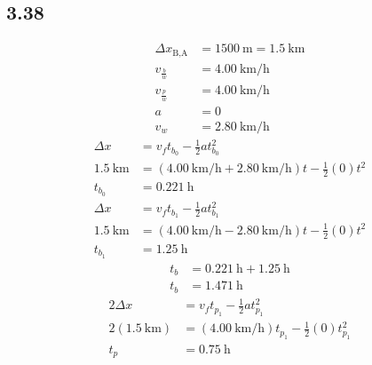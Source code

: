 \documentclass{article}
\begin{document}
\subsection{3.38}
\begin{align*}
	\Delta x_\text{B,A} & = \SI{1500}{\meter} = \SI{1.5}{\kilo \meter} \\
	v_\frac{b}{w} & = \SI{4.00}{\kilo \meter \per \hour} \\
	v_\frac{p}{w} & = \SI{4.00}{\kilo \meter \per \hour} \\
	a & = 0 \\
	v_w & = \SI{2.80}{\kilo \meter \per \hour}
\end{align*}
\begin{align*}
	\Delta x & = v_ft_{b_0} - \frac{1}{2}at_{b_0}^2 \\
	\SI{1.5}{\kilo \meter} & = (\SI{4.00}{\kilo \meter \per \hour} + \SI{2.80}{\kilo \meter \per \hour})t - \frac{1}{2}(0)t^2 \\
	t_{b_0} & = \SI{0.221}{\hour}
\end{align*}
\begin{align*}
	\Delta x & = v_ft_{b_1} - \frac{1}{2}at_{b_1}^2 \\
	\SI{1.5}{\kilo \meter} & = (\SI{4.00}{\kilo \meter \per \hour} - \SI{2.80}{\kilo \meter \per \hour})t - \frac{1}{2}(0)t^2 \\
	t_{b_1} & = \SI{1.25}{\hour}
\end{align*}
\begin{align*}
	t_b & = \SI{0.221}{\hour} + \SI{1.25}{\hour} \\
	t_b & = \SI{1.471}{\hour}
\end{align*}
\begin{align*}
	2\Delta x & = v_ft_{p_1} - \frac{1}{2}at_{p_1}^2 \\
	2(\SI{1.5}{\kilo \meter}) & = (\SI{4.00}{\kilo \meter \per \hour})t_{p_1} - \frac{1}{2}(0)t_{p_1}^2 \\
	t_p & = \SI{0.75}{\hour}
\end{align*}
\end{document}
